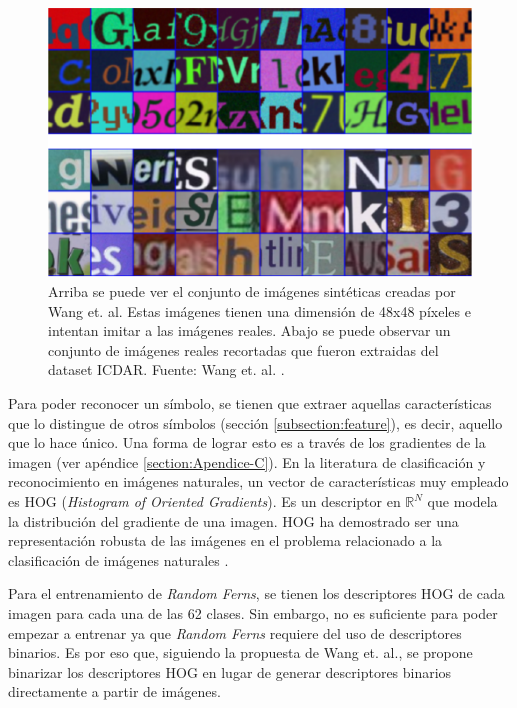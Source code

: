 		\begin{figure}[htbp]
			\centering
			\includegraphics[scale=0.5]{img/synth_data_wang.png}
			\caption[Datos sintéticos Wang]{Arriba se puede ver el conjunto de imágenes sintéticas creadas por Wang et. al. Estas imágenes tienen una dimensión de 48x48 píxeles e intentan imitar a las imágenes reales. Abajo se puede observar un conjunto de imágenes reales recortadas que  fueron extraidas del dataset ICDAR. Fuente: Wang et. al. \cite{wang}.}
			\label{fig: Datos sinteticos Wang}
		\end{figure}
	
	Para poder reconocer un símbolo, se tienen que extraer aquellas ca\-rac\-te\-rís\-ti\-cas que lo distingue de otros símbolos (sección \ref{subsection:feature}), es decir, aquello que lo hace único. Una forma de lograr esto es a través de los gradientes de la imagen (ver apéndice \ref{section:Apendice-C}). En la literatura de clasificación y reconocimiento en imágenes naturales, un vector de características muy empleado es HOG (\textit{Histogram of Oriented Gradients}). Es un descriptor en $\mathbb{R}^N$ que mo\-de\-la la distribución del gradiente de una imagen. HOG ha demostrado ser una representación robusta de las imágenes en el problema relacionado a la clasificación de imágenes naturales \cite{DT05}. 
	
	Para el entrenamiento de \textit{Random Ferns}, se tienen los descriptores HOG de cada imagen para cada una de las 62 clases. Sin embargo, no es suficiente para poder empezar a entrenar ya que \textit{Random Ferns} requiere del uso de descriptores binarios. Es por eso que, siguiendo la propuesta de Wang et. al., se propone binarizar los descriptores HOG en lugar de generar descriptores binarios directamente a partir de imágenes.
	
